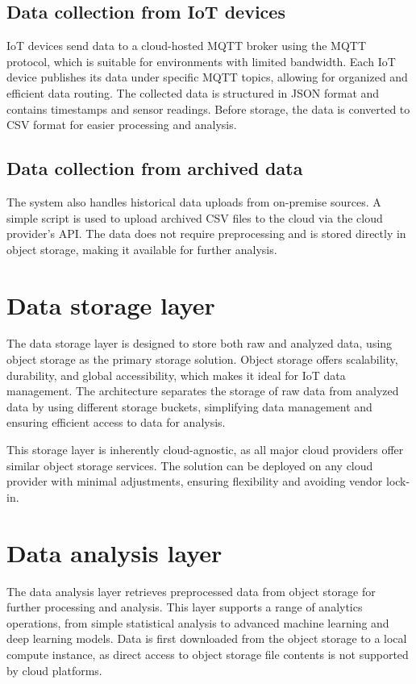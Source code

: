 \subsection{Data collection from IoT devices}
IoT devices send data to a cloud-hosted MQTT broker using the MQTT protocol, which is suitable for environments with limited bandwidth. Each IoT device publishes its data under specific MQTT topics, allowing for organized and efficient data routing. The collected data is structured in JSON format and contains timestamps and sensor readings. Before storage, the data is converted to CSV format for easier processing and analysis.

\subsection{Data collection from archived data}
The system also handles historical data uploads from on-premise sources. A simple script is used to upload archived CSV files to the cloud via the cloud provider's API. The data does not require preprocessing and is stored directly in object storage, making it available for further analysis.

\section{Data storage layer}

The data storage layer is designed to store both raw and analyzed data, using object storage as the primary storage solution. Object storage offers scalability, durability, and global accessibility, which makes it ideal for IoT data management. The architecture separates the storage of raw data from analyzed data by using different storage buckets, simplifying data management and ensuring efficient access to data for analysis.

This storage layer is inherently cloud-agnostic, as all major cloud providers offer similar object storage services. The solution can be deployed on any cloud provider with minimal adjustments, ensuring flexibility and avoiding vendor lock-in.

\section{Data analysis layer}

The data analysis layer retrieves preprocessed data from object storage for further processing and analysis. This layer supports a range of analytics operations, from simple statistical analysis to advanced machine learning and deep learning models. Data is first downloaded from the object storage to a local compute instance, as direct access to object storage file contents is not supported by cloud platforms.

